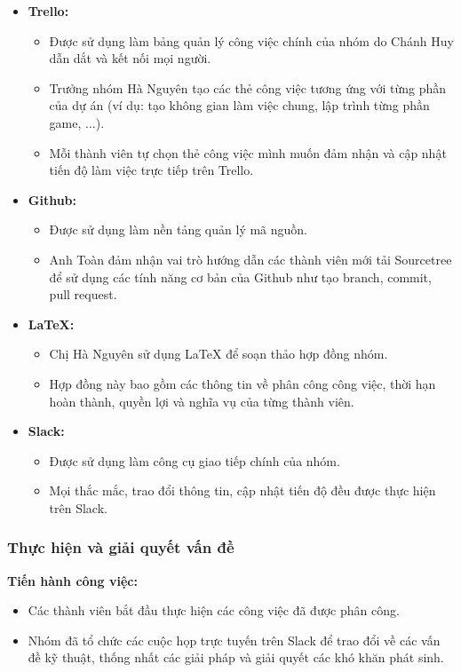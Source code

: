\documentclass[a4paper,12pt]{article}
\begin{document}
\begin{itemize}
    \item \textbf{Trello:} 
    \begin{itemize}
        \item Được sử dụng làm bảng quản lý công việc chính của nhóm do Chánh Huy dẫn dắt và kết nối mọi người.
        \item Trưởng nhóm Hà Nguyên tạo các thẻ công việc tương ứng với từng phần của dự án (ví dụ: tạo không gian làm việc chung, lập trình từng phần game, ...).
        \item Mỗi thành viên tự chọn thẻ công việc mình muốn đảm nhận và cập nhật tiến độ làm việc trực tiếp trên Trello.
    \end{itemize}

    \item \textbf{Github:}
    \begin{itemize}
        \item Được sử dụng làm nền tảng quản lý mã nguồn.
        \item Anh Toàn đảm nhận vai trò hướng dẫn các thành viên mới tải Sourcetree để sử dụng các tính năng cơ bản của Github như tạo branch, commit, pull request.
    \end{itemize}

    \item \textbf{LaTeX:}
    \begin{itemize}
        \item Chị Hà Nguyên sử dụng LaTeX để soạn thảo hợp đồng nhóm.
        \item Hợp đồng này bao gồm các thông tin về phân công công việc, thời hạn hoàn thành, quyền lợi và nghĩa vụ của từng thành viên.
    \end{itemize}

    \item \textbf{Slack:}
    \begin{itemize}
        \item Được sử dụng làm công cụ giao tiếp chính của nhóm.
        \item Mọi thắc mắc, trao đổi thông tin, cập nhật tiến độ đều được thực hiện trên Slack.
    \end{itemize}
\end{itemize}

\subsubsection*{Thực hiện và giải quyết vấn đề}
\textbf{Tiến hành công việc:}
\begin{itemize}
    \item Các thành viên bắt đầu thực hiện các công việc đã được phân công.
    \item Nhóm đã tổ chức các cuộc họp trực tuyến trên Slack để trao đổi về các vấn đề kỹ thuật, thống nhất các giải pháp và giải quyết các khó khăn phát sinh.
\end{itemize}
\end{document}
